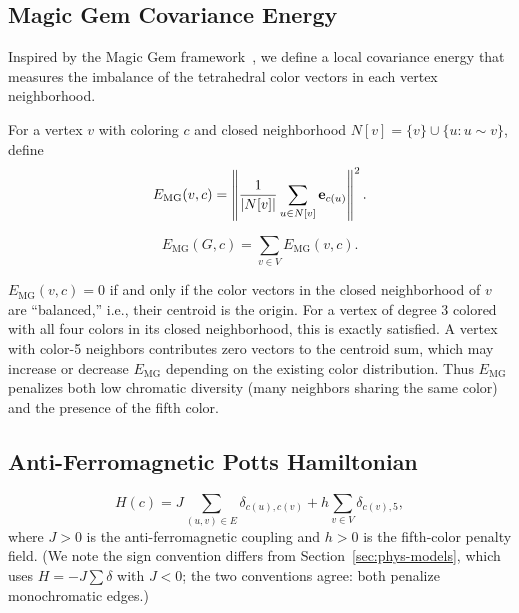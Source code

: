 \subsection{Magic Gem Covariance Energy}\label{sec:mg-energy}

Inspired by the Magic Gem framework~\cite{mathewson2025}, we define a
local covariance energy that measures the imbalance of the tetrahedral
color vectors in each vertex neighborhood.

\begin{definition}\label{def:mg-local}
For a vertex $v$ with coloring $c$ and closed neighborhood
$N[v] = \{v\} \cup \{u : u \sim v\}$, define
\begin{equation}\label{eq:mg-local}
  E_{\mathrm{MG}}(v, c) =
  \left\lVert
    \frac{1}{\lvert N[v] \rvert} \sum_{u \in N[v]} \mathbf{e}_{c(u)}
  \right\rVert^2.
\end{equation}
\end{definition}

\begin{definition}\label{def:mg-global}
\begin{equation}\label{eq:mg-global}
  E_{\mathrm{MG}}(G, c) = \sum_{v \in V} E_{\mathrm{MG}}(v, c).
\end{equation}
\end{definition}

\begin{remark}\label{rem:mg-interp}
$E_{\mathrm{MG}}(v, c) = 0$ if and only if the color vectors in the
closed neighborhood of $v$ are ``balanced,'' i.e., their centroid is
the origin. For a vertex of degree 3 colored with all four colors in
its closed neighborhood, this is exactly satisfied. A vertex with
color-5 neighbors contributes zero vectors to the
centroid sum, which may increase or decrease $E_{\mathrm{MG}}$
depending on the existing color distribution. Thus $E_{\mathrm{MG}}$
penalizes both low chromatic diversity
(many neighbors sharing the same color) and the presence of the fifth
color.
\end{remark}

\subsection{Anti-Ferromagnetic Potts Hamiltonian}\label{sec:potts}

\begin{definition}\label{def:potts-ham}
\begin{equation}\label{eq:potts-ham}
  H(c) = J \sum_{(u,v) \in E} \delta_{c(u), c(v)}
         + h \sum_{v \in V} \delta_{c(v), 5},
\end{equation}
where $J > 0$ is the anti-ferromagnetic coupling and $h > 0$ is the
fifth-color penalty field. (We note the sign convention differs from
Section~\ref{sec:phys-models}, which uses $H = -J\sum\delta$ with
$J < 0$; the two conventions agree: both penalize monochromatic edges.)
\end{definition}

